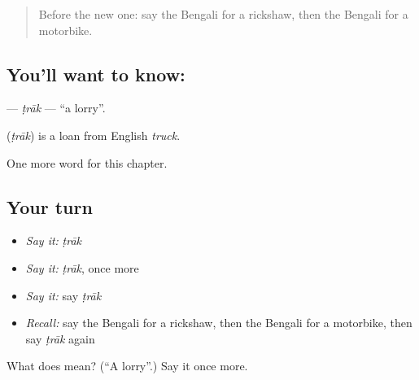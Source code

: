 \label{lesson:BN-C167-trak}



\begin{quote}
Before the new one: say the Bengali for a rickshaw, then the Bengali for a motorbike.
\end{quote}

\subsection*{You'll want to know: }
\textbf{} — \emph{ṭrāk} — \textquotedblleft{}a lorry\textquotedblright{}.

\begin{cousinweb}
\textbf{} (\emph{ṭrāk}) is a loan from English \emph{truck}.
\end{cousinweb}

\begin{grammarlens}[title={What you've built}]
One more word for this chapter.
\end{grammarlens}

\subsection*{Your turn}
\begin{itemize}
\raggedright
  \item \emph{Say it:} \emph{ṭrāk}
  \item \emph{Say it:} \emph{ṭrāk}, once more
  \item \emph{Say it:} say \emph{ṭrāk}
  \item \emph{Recall:} say the Bengali for a rickshaw, then the Bengali for a motorbike, then say \emph{ṭrāk} again
\end{itemize}

\begin{tcolorbox}[breakable,colback=teal!4,colframe=teal!35!black,title={Before you move on}]
What does  mean? (\textquotedblleft{}A lorry\textquotedblright{}.) Say it once more.
\end{tcolorbox}
